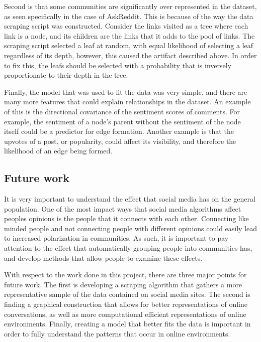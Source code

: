 \documentclass[
]{article}
\begin{document}
Second is that some communities are significantly over represented in the dataset, as seen specifically in the case of AskReddit. This is because of the way the data scraping script was constructed. Consider the links visited as a tree where each link is a node, and its children are the links that it adds to the pool of links. The scraping script selected a leaf at random, with equal likelihood of selecting a leaf regardless of its depth, however, this caused the artifact described above. In order to fix this, the leafs should be selected with a probability that is inversely proportionate to their depth in the tree.

Finally, the model that was used to fit the data was very simple, and there are many more features that could explain relationships in the dataset. An example of this is the directional covariance of the sentiment scores of comments. For example, the sentiment of a node's parent without the sentiment of the node itself could be a predictor for edge formation. Another example is that the upvotes of a post, or popularity, could affect its visibility, and therefore the likelihood of an edge being formed.

\hypertarget{future-work}{%
\subsection{Future work}\label{future-work}}

It is very important to understand the effect that social media has on the general population. One of the most impact ways that social media algorithms affect peoples opinions is the people that it connects with each other. Connecting like minded people and not connecting people with different opinions could easily lead to increased polarization in communities. As such, it is important to pay attention to the effect that automatically grouping people into communities has, and develop methods that allow people to examine these effects.

With respect to the work done in this project, there are three major points for future work. The first is developing a scraping algorithm that gathers a more representative sample of the data contained on social media sites. The second is finding a graphical construction that allows for better representations of online conversations, as well as more computational efficient representations of online environments. Finally, creating a model that better fits the data is important in order to fully understand the patterns that occur in online environments.
\end{document}
